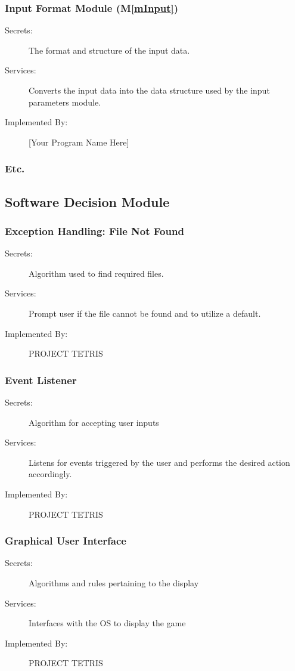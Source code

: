 \documentclass[12pt, titlepage]{article}
\newcommand{\mref}[1]{M\ref{#1}}
\begin{document}
\subsubsection{Input Format Module (\mref{mInput})}
\begin{description}
\item[Secrets:]The format and structure of the input data.
\item[Services:]Converts the input data into the data structure used by the
  input parameters module.
\item[Implemented By:] [Your Program Name Here]
\end{description}
\subsubsection{Etc.}

\subsection{Software Decision Module}
\subsubsection{Exception Handling: File Not Found}
\begin{description}
\item[Secrets:] Algorithm used to find required files.
\item[Services:] Prompt user if the file cannot be found and to utilize a default. 
\item[Implemented By:] PROJECT TETRIS
\end{description}
\subsubsection{Event Listener}
\begin{description}
\item[Secrets:] Algorithm for accepting user inputs
\item[Services:] Listens for events triggered by the user and performs the desired
action accordingly.
\item[Implemented By:] PROJECT TETRIS
\end{description}
\subsubsection{Graphical User Interface}
\begin{description}
\item[Secrets:] Algorithms and rules pertaining to the display
\item[Services:] Interfaces with the OS to display the game
\item[Implemented By:] PROJECT TETRIS
\end{description}
\end{document}
